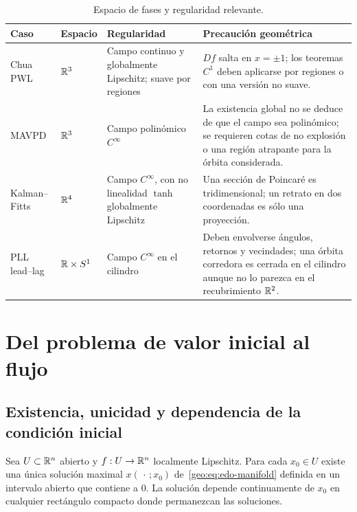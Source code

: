 \begin{table}[H]
\centering
\caption{Espacio de fases y regularidad relevante.}
\label{geo:tab:regularity-cases}
\small
\begin{tabularx}{\textwidth}{@{}L{0.18\textwidth}L{0.16\textwidth}L{0.25\textwidth}Y@{}}
\toprule
Caso & Espacio & Regularidad & Precaución geométrica \\
\midrule
Chua PWL & \(\mathbb{R}^3\) & Campo continuo y globalmente Lipschitz; suave por
regiones & \(Df\) salta en \(x=\pm1\); los teoremas \(C^1\) deben aplicarse por
regiones o con una versión no suave. \\
MAVPD & \(\mathbb{R}^3\) & Campo polinómico \(C^\infty\) & La existencia global no se
deduce de que el campo sea polinómico; se requieren cotas de no explosión o
una región atrapante para la órbita considerada. \\
Kalman--Fitts & \(\mathbb{R}^4\) & Campo \(C^\infty\), con no linealidad
\(\tanh\) globalmente Lipschitz & Una sección de Poincaré es tridimensional;
un retrato en dos coordenadas es sólo una proyección. \\
PLL lead--lag & \(\mathbb{R}\times S^1\) & Campo \(C^\infty\) en el cilindro & Deben
envolverse ángulos, retornos y vecindades; una órbita corredora es cerrada en
el cilindro aunque no lo parezca en el recubrimiento \(\mathbb{R}^2\). \\
\bottomrule
\end{tabularx}
\end{table}

\HAFOStudyNeedspace
\section{Del problema de valor inicial al flujo}
\label{sec:geo-flujo}

\HAFOCardFlow

\subsection{Existencia, unicidad y dependencia de la condición inicial}

\begin{proposition}
Sea \(U\subset\mathbb{R}^n\) abierto y \(f:U\to\mathbb{R}^n\) localmente Lipschitz. Para cada
\(x_0\in U\) existe una única solución maximal
\(x(\,\cdot\,;x_0)\) de~\eqref{geo:eq:edo-manifold} definida en un intervalo
abierto que contiene a \(0\). La solución depende continuamente de \(x_0\) en
cualquier rectángulo compacto donde permanezcan las soluciones.
\end{proposition}

